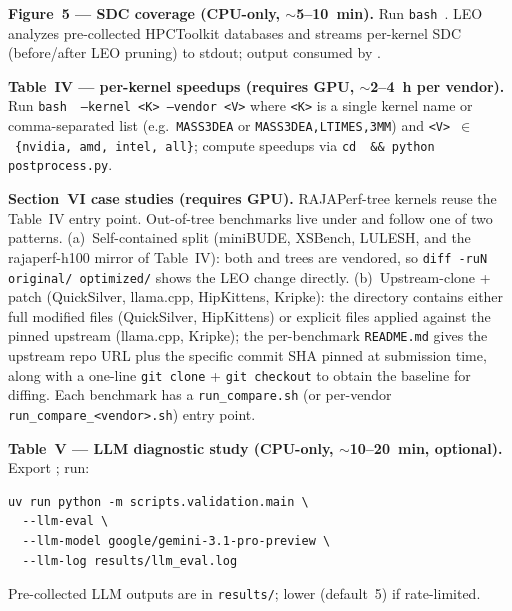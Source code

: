 \documentclass[conference]{IEEEtran}
\begin{document}
\textbf{Figure~5 --- SDC coverage (CPU-only, $\sim$5--10~min).}
Run \texttt{bash}~. LEO analyzes pre-collected HPCToolkit databases and streams per-kernel SDC (before/after LEO pruning) to stdout; output consumed by .

\textbf{Table~IV --- per-kernel speedups (requires GPU, $\sim$2--4~h per vendor).}
Run \texttt{bash}~~\texttt{--kernel <K> --vendor <V>} where \texttt{<K>} is a single kernel name or comma-separated list (e.g.\ \texttt{MASS3DEA} or \texttt{MASS3DEA,LTIMES,3MM}) and \texttt{<V>}~$\in$~\texttt{\{nvidia,~amd,~intel,~all\}}; compute speedups via \texttt{cd}~~\texttt{\&\& python postprocess.py}.

\textbf{Section~VI case studies (requires GPU).}
RAJAPerf-tree kernels reuse the Table~IV entry point. Out-of-tree benchmarks live under  and follow one of two patterns. (a)~Self-contained split (miniBUDE, XSBench, LULESH, and the rajaperf-h100 mirror of Table~IV): both  and  trees are vendored, so \texttt{diff -ruN original/ optimized/} shows the LEO change directly. (b)~Upstream-clone + patch (QuickSilver, llama.cpp, HipKittens, Kripke): the  directory contains either full modified files (QuickSilver, HipKittens) or explicit  files applied against the pinned upstream (llama.cpp, Kripke); the per-benchmark \texttt{README.md} gives the upstream repo URL plus the specific commit SHA pinned at submission time, along with a one-line \texttt{git clone} + \texttt{git checkout} to obtain the baseline for diffing. Each benchmark has a \texttt{run\_compare.sh} (or per-vendor \texttt{run\_compare\_<vendor>.sh}) entry point.

\textbf{Table~V --- LLM diagnostic study (CPU-only, $\sim$10--20~min, optional).}
Export ; run:
\begingroup\small
\begin{verbatim}
uv run python -m scripts.validation.main \
  --llm-eval \
  --llm-model google/gemini-3.1-pro-preview \
  --llm-log results/llm_eval.log
\end{verbatim}
\endgroup
Pre-collected LLM outputs are in \texttt{results/}; lower  (default~5) if rate-limited.

\artout
\end{document}
